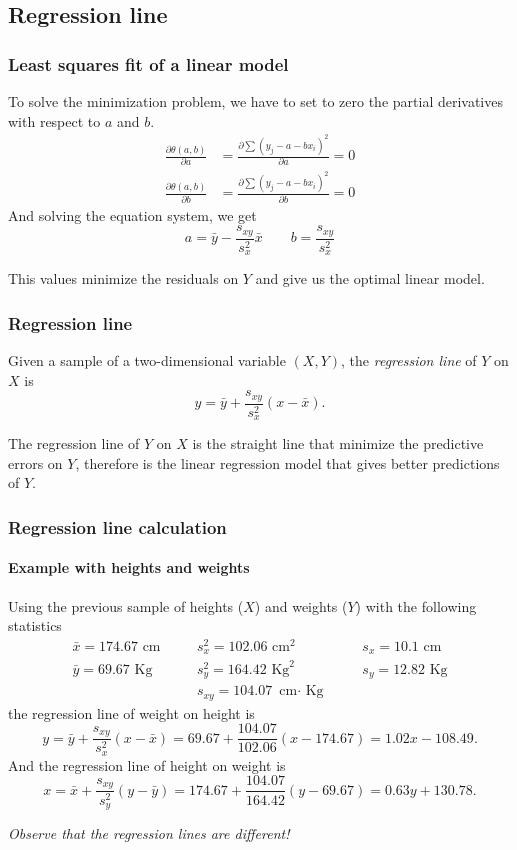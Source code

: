 \subsection{Regression line}
\begin{frame}
\frametitle{Least squares fit of a linear model}
To solve the minimization problem, we have to set to zero the partial derivatives with respect to $a$ and $b$.  
\begin{align*}
\frac{\partial \theta(a,b)}{\partial a} &=  \frac{\partial \sum (y_j-a-bx_i)^2 }{\partial a} =0\\
\frac{\partial \theta(a,b)}{\partial b} &=  \frac{\partial \sum (y_j-a-bx_i)^2 }{\partial b} =0
\end{align*}
And solving the equation system, we get
\[
a= \bar y - \frac{s_{xy}}{s_x^2}\bar x \qquad b=\frac{s_{xy}}{s_x^2}
\]

This values minimize the residuals on $Y$ and give us the optimal linear model.
\end{frame}


\begin{frame}
\frametitle{Regression line}
\begin{definition}
Given a sample of a two-dimensional variable $(X,Y)$, the \emph{regression line} of $Y$ on $X$ is
\[
y = \bar y +\frac{s_{xy}}{s_x^2}(x-\bar x).
\]
\end{definition}

The regression line of $Y$ on $X$ is the straight line that minimize the predictive errors on $Y$, therefore is the
linear regression model that gives better predictions of $Y$.
\end{frame}


\begin{frame}
\frametitle{Regression line calculation}
\framesubtitle{Example with heights and weights}
Using the previous sample of heights ($X$) and weights ($Y$) with the following statistics
\[
\begin{array}{lllll}
\bar x = 174.67 \mbox{ cm} & \quad & s^2_x = 102.06 \mbox{ cm}^2 & \quad & s_x = 10.1 \mbox{ cm}\\
\bar y = 69.67 \mbox{ Kg} & & s^2_y = 164.42 \mbox{ Kg}^2 & & s_y = 12.82 \mbox{ Kg}\\
& & s_{xy} = 104.07 \mbox{ cm$\cdot$ Kg} & &
\end{array}
\]
the regression line of weight on height is  
\[
y = \bar y +\frac{s_{xy}}{s_x^2}(x-\bar x) = 69.67+\frac{104.07}{102.06}(x-174.67) = 1.02 x - 108.49.
\]
And the regression line of height on weight is 
\[
x = \bar x +\frac{s_{xy}}{s_y^2}(y-\bar y) = 174.67+\frac{104.07}{164.42}(y-69.67) = 0.63 y +130.78.
\]
\begin{center}
\emph{Observe that the regression lines are different!}
\end{center}
\end{frame}


